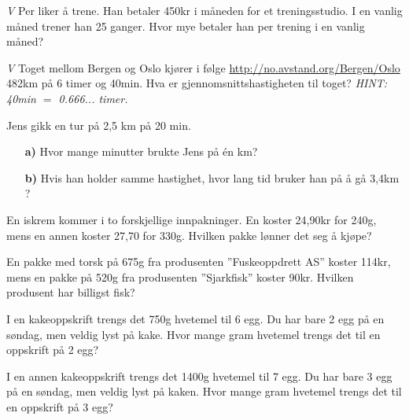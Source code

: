 \documentclass[a4, 11pt, twoside]{article}
\theoremstyle{definition}
\begin{document}
\begin{Exercise}
\textit{V}\newline
Per liker å trene. Han betaler 450kr i måneden for et treningsstudio.
I en vanlig måned trener han 25 ganger. Hvor mye betaler han per
trening i en vanlig måned?
\end{Exercise}

\begin{Exercise}
\textit{V}\newline
  Toget mellom Bergen og Oslo kjører i følge \url{http://no.avstand.org/Bergen/Oslo}
  482km på 6 timer og 40min. Hva er gjennomsnittshastigheten til toget?
  \newline \it{HINT: }40min $ = $ 0.666... timer.
\end{Exercise}

\begin{Exercise}
Jens gikk en tur på 2,5 km på 20 min.
\begin{itemize}
\item[\bf a)] Hvor mange minutter brukte Jens på én km?
\item[\bf b)] Hvis han holder samme hastighet,
hvor lang tid bruker han på å gå 3,4km ?
\end{itemize}
\end{Exercise}

\begin{Exercise}
En iskrem kommer i to forskjellige innpakninger.
En koster 24,90kr for 240g, mens en annen koster 
27,70 for 330g. Hvilken pakke lønner det seg å kjøpe?
\end{Exercise}

\begin{Exercise}
En pakke med torsk på 675g fra produsenten ''Fuskeoppdrett AS''
koster 114kr, mens en pakke på 520g fra produsenten ''Sjarkfisk''
koster 90kr. Hvilken produsent har billigst fisk?
\end{Exercise}

\begin{Exercise}
  I en kakeoppskrift trengs det 750g hvetemel til 6 egg.
  Du har bare 2 egg på en søndag, men veldig lyst på kake.
  Hvor mange gram hvetemel trengs det til en oppskrift på 2 egg?
\end{Exercise}

\begin{Exercise}
  I en annen kakeoppskrift trengs det 1400g hvetemel til 7 egg.
  Du har bare 3 egg på en søndag, men veldig lyst på kaken.
  Hvor mange gram hvetemel trengs det til en oppskrift på 3 egg?
\end{Exercise}
\end{document}
